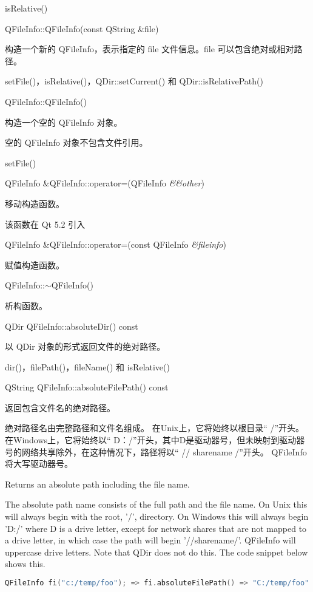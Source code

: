 \begin{notice}[另请参阅]
 isRelative()
\end{notice}

QFileInfo::QFileInfo(const QString \&file)

构造一个新的 QFileInfo，表示指定的 file 文件信息。file 可以包含绝对或相对路径。


\begin{notice}[另请参阅]
setFile()，isRelative()，QDir::setCurrent() 和
QDir::isRelativePath()
\end{notice}

QFileInfo::QFileInfo()

构造一个空的 QFileInfo 对象。

\begin{notice}
空的 QFileInfo 对象不包含文件引用。
\end{notice}


\begin{notice}[另请参阅]
 setFile()
\end{notice}


QFileInfo \&QFileInfo::operator=(QFileInfo \emph{\&\&other})

移动构造函数。

该函数在 Qt 5.2 引入

QFileInfo \&QFileInfo::operator=(const QFileInfo \emph{\&fileinfo})

赋值构造函数。

QFileInfo::$\sim$QFileInfo()

析构函数。

QDir QFileInfo::absoluteDir() const

以 QDir 对象的形式返回文件的绝对路径。


\begin{notice}[另请参阅]
dir()，filePath()，fileName() 和 isRelative()
\end{notice}

QString QFileInfo::absoluteFilePath() const

返回包含文件名的绝对路径。

绝对路径名由完整路径和文件名组成。 在Unix上，它将始终以根目录“ /”开头。 
在Windows上，它将始终以“ D：/”开头，其中D是驱动器号，但未映射到驱动器号的网络共享除外，在这种情况下，路径将以“ // sharename /”开头。 QFileInfo 将大写驱动器号。

Returns an absolute path including the file name.

The absolute path name consists of the full path and the file name. On
Unix this will always begin with the root, '/', directory. On Windows
this will always begin 'D:/' where D is a drive letter, except for
network shares that are not mapped to a drive letter, in which case
the path will begin '//sharename/'. QFileInfo will uppercase drive
letters. Note that QDir does not do this. The code snippet below shows
this.

\begin{lstlisting}[language=C++]
QFileInfo fi("c:/temp/foo"); => fi.absoluteFilePath() => "C:/temp/foo"
\end{lstlisting}